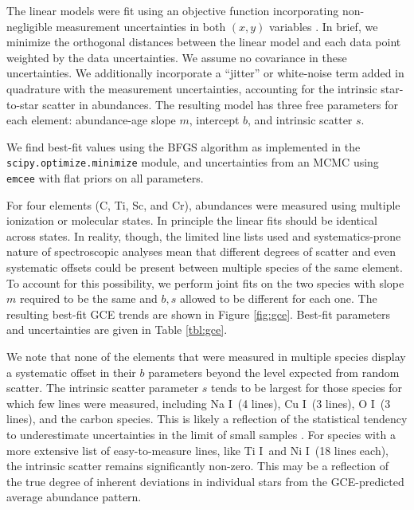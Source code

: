 \documentclass[twocolumn]{aastex62}
\newcommand{\I}{\textsc{I}}
\newcommand{\acronym}[1]{{\small{#1}}}
\begin{document}
The linear models were fit using an objective function incorporating non-negligible measurement uncertainties in both $(x, y)$ variables \citep{hogg10}. In brief, we minimize the orthogonal distances between the linear model and each data point weighted by the data uncertainties. We assume no covariance in these uncertainties. We additionally incorporate a ``jitter'' or white-noise term added in quadrature with the measurement uncertainties, accounting for the intrinsic star-to-star scatter in abundances. The resulting model has three free parameters for each element: abundance-age slope $m$, intercept $b$, and intrinsic scatter $s$. 

We find best-fit values using the \acronym{BFGS} algorithm as implemented in the \texttt{scipy.optimize.minimize} module, and uncertainties from an \acronym{MCMC} using \texttt{emcee} \citep{emcee} with flat priors on all parameters.

For four elements (C, Ti, Sc, and Cr), abundances were measured using multiple ionization or molecular states. In principle the linear fits should be identical across states. In reality, though, the limited line lists used and systematics-prone nature of spectroscopic analyses mean that different degrees of scatter and even systematic offsets could be present between multiple species of the same element. To account for this possibility, we perform joint fits on the two species with slope $m$ required to be the same and $b, s$ allowed to be different for each one. The resulting best-fit \acronym{GCE} trends are shown in Figure \ref{fig:gce}. Best-fit parameters and uncertainties are given in Table \ref{tbl:gce}.

We note that none of the elements that were measured in multiple species display a systematic offset in their $b$ parameters beyond the level expected from random scatter. The intrinsic scatter parameter $s$ tends to be largest for those species for which few lines were measured, including Na \I\ (4 lines), Cu \I\ (3 lines), O \I\ (3 lines), and the carbon species. This is likely a reflection of the statistical tendency to underestimate uncertainties in the limit of small samples \citep{adibekyan15}. For species with a more extensive list of easy-to-measure lines, like Ti \I\ and Ni \I\ (18 lines each), the intrinsic scatter remains significantly non-zero. This may be a reflection of the true degree of inherent deviations in individual stars from the \acronym{GCE}-predicted average abundance pattern.
\end{document}
